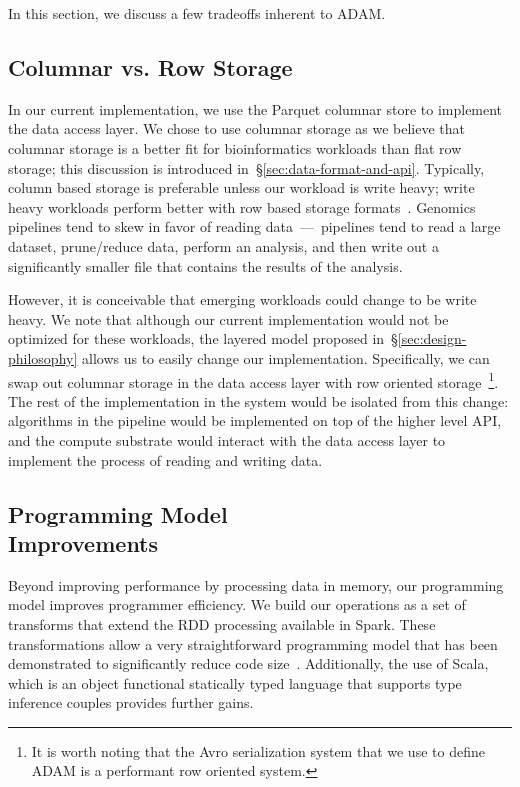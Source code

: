 \documentclass[10pt,twocolumn]{article}
\theoremstyle{plain}
\begin{document}
In this section, we discuss a few tradeoffs inherent to ADAM.

\subsection{Columnar vs. Row Storage}
\label{sec:columnar-vs-row-storage}

In our current implementation, we use the Parquet columnar store to implement the data access layer. We chose to use
columnar storage as we believe that columnar storage is a better fit for bioinformatics workloads than flat row storage;
this discussion is introduced in~\S\ref{sec:data-format-and-api}. Typically, column based storage is preferable unless
our workload is write heavy; write heavy workloads perform better with row based storage formats~\cite{stonebraker05}.
Genomics pipelines tend to skew in favor of reading data~---~pipelines tend to read a large dataset, prune/reduce data,
perform an analysis, and then write out a significantly smaller file that contains the results of the analysis.

However, it is conceivable that emerging workloads could change to be write heavy. We note that although our current
implementation would not be optimized for these workloads, the layered model proposed in~\S\ref{sec:design-philosophy}
allows us to easily change our implementation. Specifically, we can swap out columnar storage in the data access layer with
row oriented storage~\footnote{It is worth noting that the Avro serialization system that we use to define ADAM is a performant
row oriented system.}. The rest of the implementation in the system would be isolated from this change: algorithms in the
pipeline would be implemented on top of the higher level API, and the compute substrate would interact with the data access
layer to implement the process of reading and writing data.

\subsection{Programming Model\\Improvements}
\label{sec:programming-model-improvements}

Beyond improving performance by processing data in memory, our programming model improves programmer efficiency.
We build our operations as a set of transforms that extend the RDD processing available in Spark. These transformations
allow a very straightforward programming model that has been demonstrated to significantly reduce code size~\cite{zaharia12}.
Additionally, the use of Scala, which is an object functional statically typed language that supports type inference couples
provides further gains.
\end{document}
